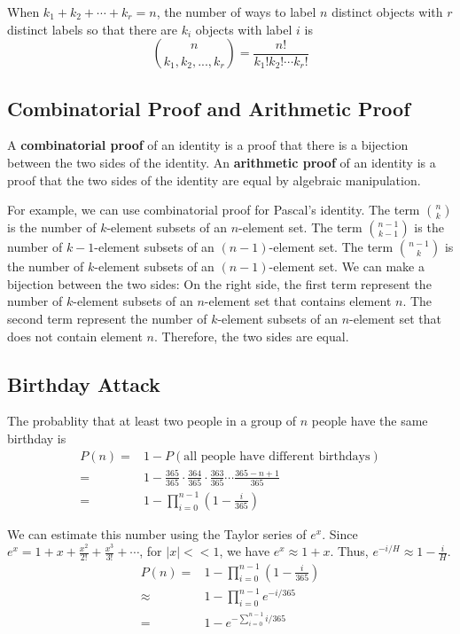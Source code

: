 \documentclass[a4paper,12pt]{article}
\begin{document}
When $k_1 + k_2 + \cdots + k_r = n$, the number of ways to label $n$ distinct objects with $r$ distinct labels so that there are $k_i$ objects with label $i$ is
\begin{equation*}
	\binom{n}{k_1, k_2, ..., k_r} = \frac{n!}{k_1! k_2! \cdots k_r!}
\end{equation*}

\subsection{Combinatorial Proof and Arithmetic Proof}

A \textbf{combinatorial proof} of an identity is a proof that there is a bijection between the two sides of the identity.
An \textbf{arithmetic proof} of an identity is a proof that the two sides of the identity are equal by algebraic manipulation.

For example, we can use combinatorial proof for Pascal's identity.
The term $\binom{n}{k}$ is the number of $k$-element subsets of an $n$-element set.
The term $\binom{n-1}{k-1}$ is the number of $k-1$-element subsets of an $(n-1)$-element set.
The term $\binom{n-1}{k}$ is the number of $k$-element subsets of an $(n-1)$-element set.
We can make a bijection between the two sides:
On the right side, the first term represent the number of $k$-element subsets of an $n$-element set that contains element $n$.
The second term represent the number of $k$-element subsets of an $n$-element set that does not contain element $n$.
Therefore, the two sides are equal.

\subsection{Birthday Attack}

The probablity that at least two people in a group of $n$ people have the same birthday is
\begin{align*}
	P(n) =& 1 - P(\text{all people have different birthdays}) \\
	=& 1 - \frac{365}{365} \cdot \frac{364}{365} \cdot \frac{363}{365} \cdots \frac{365-n+1}{365} \\
	=& 1 - \prod_{i=0}^{n-1} \left(1 - \frac{i}{365}\right)
\end{align*}

We can estimate this number using the Taylor series of $e^x$.
Since $e^x = 1 + x + \frac{x^2}{2!} + \frac{x^3}{3!} + \cdots$, for $|x| << 1$, we have $e^x \approx 1 + x$.
Thus, $e^{-i/H} \approx 1 - \frac{i}{H}$.
\begin{align*}
	P(n) =& 1 - \prod_{i=0}^{n-1} \left(1 - \frac{i}{365}\right) \\
	\approx& 1 - \prod_{i=0}^{n-1} e^{-i/365} \\
	=& 1 - e^{-\sum_{i=0}^{n-1} i/365} \\
\end{align*}
\end{document}
